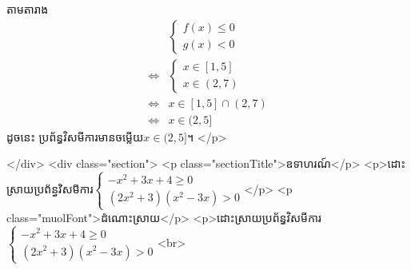     តាមតារាង
    $$\begin{aligned}
        &\begin{cases}f(x)\le 0\\ g(x)\lt 0 \end{cases}\\
        \Leftrightarrow& \begin{cases}x\in [1,5]\\ x\in (2,7) \end{cases}\\
        \Leftrightarrow &x\in [1,5]\cap (2,7)\\
        \Leftrightarrow &x\in (2,5]
    \end{aligned}$$
    ដូចនេះ ប្រព័ន្ធវិសមីការមានចម្លើយ$x\in (2,5]$។
    </p>
    
</div>
<div class="section">
    <p class="sectionTitle">ឧទាហរណ៍</p>
    <p>ដោះស្រាយប្រព័ន្ធវិសមីការ$\begin{cases}-x^2+3x+4\ge 0\\ \left(2x^2+3\right)\left(x^2-3x\right) \gt 0 \end{cases}$</p>
    <p class="muolFont">ដំណោះស្រាយ</p>
    <p>ដោះស្រាយប្រព័ន្ធវិសមីការ$\begin{cases}-x^2+3x+4\ge 0\\ \left(2x^2+3\right)\left(x^2-3x\right) \gt 0 \end{cases}$<br>
